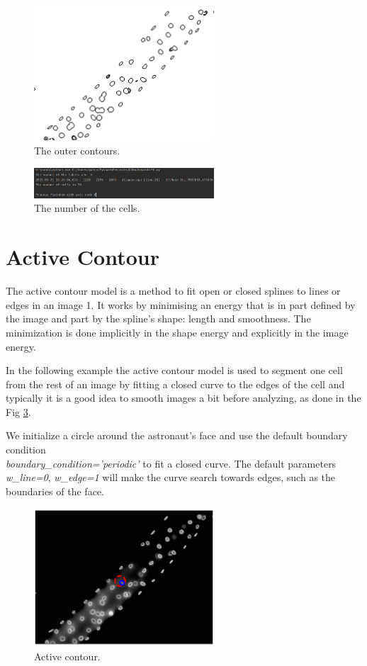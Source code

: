 \documentclass{article}
\begin{document}
\begin{figure} [H]
\centering
\includegraphics[width=0.6\textwidth]{TheContours2.jpg}
\caption{\label{fig:Countours2}The outer contours.}
\end{figure}

\begin{figure} [H]
\centering
\includegraphics[width=0.6\textwidth]{number2.png}
\caption{\label{fig:number2}The number of the cells.}
\end{figure}
\section{Active Contour}
The active contour model is a method to fit open or closed splines to lines or edges in an image 1. It works by minimising an energy that is in part defined by the image and part by the spline’s shape: length and smoothness. The minimization is done implicitly in the shape energy and explicitly in the image energy.

In the following example the active contour model is used to segment one cell from the rest of an image by fitting a closed curve to the edges of the cell and  typically it is a good idea to smooth images a bit before analyzing, as done in the Fig \ref{fig:AC}.

We initialize a circle around the astronaut’s face and use the default boundary condition\\ \emph{boundary\_condition='periodic'}  to fit a closed curve. The default parameters \emph{w\_line=0}, \emph{w\_edge=1} will make the curve search towards edges, such as the boundaries of the face.
\begin{figure} [H]
\centering
\includegraphics[width=0.6\textwidth]{AC.png}
\caption{\label{fig:AC}Active contour.}
\end{figure}
\end{document}
